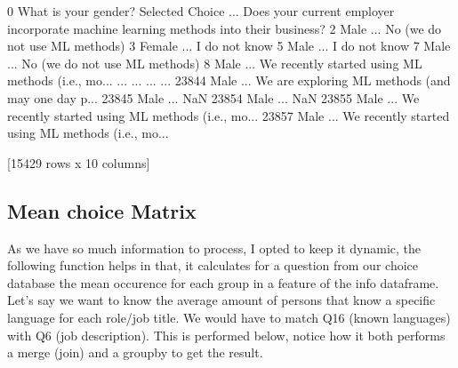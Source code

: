 \documentclass[letterpaper,10pt,english]{jupyterBook}
\begin{document}
\begin{sphinxVerbatim}[commandchars=\\\{\}]
0     What is your gender? \PYGZhy{} Selected Choice  ... Does your current employer incorporate machine learning methods into their business?
2                                       Male  ...                      No (we do not use ML methods)                                  
3                                     Female  ...                                      I do not know                                  
5                                       Male  ...                                      I do not know                                  
7                                       Male  ...                      No (we do not use ML methods)                                  
8                                       Male  ...  We recently started using ML methods (i.e., mo...                                  
...                                      ...  ...                                                ...                                  
23844                                   Male  ...  We are exploring ML methods (and may one day p...                                  
23845                                   Male  ...                                                NaN                                  
23854                                   Male  ...                                                NaN                                  
23855                                   Male  ...  We recently started using ML methods (i.e., mo...                                  
23857                                   Male  ...  We recently started using ML methods (i.e., mo...                                  

[15429 rows x 10 columns]
\end{sphinxVerbatim}


\subsection{Mean choice Matrix}
\label{\detokenize{c7_case_studies/UserSurvey:mean-choice-matrix}}
\sphinxAtStartPar
As we have so much information to process, I opted to keep it dynamic, the following function helps in that, it calculates for a question from our choice database the mean occurence for each group in a feature of the info dataframe.
Let’s say we want to know the average amount of persons that know a specific language for each role/job title. We would have to match Q16 (known languages) with Q6 (job description). This is performed below, notice how it both performs a merge (join) and a groupby to get the result.
\end{document}
